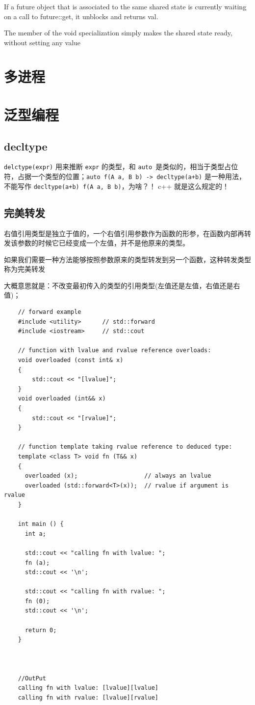 \documentclass[UTF8,a4paper,12pt]{ctexbook}
\begin{document}
			If a future object that is associated to the same shared state is currently waiting on a call to future::get, it unblocks and returns val.
			
			The member of the void specialization simply makes the shared state ready, without setting any value	
	

\chapter{多进程}



	 
\chapter{泛型编程}
	
	\section{decltype}
		\verb|delctype(expr)| 用来推断 \verb|expr| 的类型，和 \verb|auto |是类似的，相当于类型占位符，占据一个类型的位置；\verb|auto f(A a, B b) -> decltype(a+b)| 是一种用法，不能写作 \verb|decltype(a+b) f(A a, B b)|，为啥？！ c++ 就是这么规定的！
		
		
	\section{完美转发}
		右值引用类型是独立于值的，一个右值引用参数作为函数的形参，在函数内部再转发该参数的时候它已经变成一个左值，并不是他原来的类型。
					
		如果我们需要一种方法能够按照参数原来的类型转发到另一个函数，这种转发类型称为完美转发
		
		大概意思就是：不改变最初传入的类型的引用类型(左值还是左值，右值还是右值)；
		\begin{lstlisting}
	// forward example
	#include <utility>      // std::forward
	#include <iostream>     // std::cout
	
	// function with lvalue and rvalue reference overloads:
	void overloaded (const int& x) 
	{
		std::cout << "[lvalue]";
	}
	void overloaded (int&& x) 
	{
		std::cout << "[rvalue]";
	}
	
	// function template taking rvalue reference to deduced type:
	template <class T> void fn (T&& x) 
	{
	  overloaded (x);                   // always an lvalue
	  overloaded (std::forward<T>(x));  // rvalue if argument is rvalue
	}
	
	int main () {
	  int a;
	
	  std::cout << "calling fn with lvalue: ";
	  fn (a);
	  std::cout << '\n';
	
	  std::cout << "calling fn with rvalue: ";
	  fn (0);
	  std::cout << '\n';
	
	  return 0;
	}
	
	
	
	//OutPut
	calling fn with lvalue: [lvalue][lvalue]
	calling fn with rvalue: [lvalue][rvalue]
		\end{lstlisting}
\end{document}
